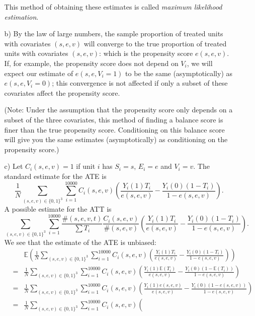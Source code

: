 \documentclass{article}
\def\E{{\mathbb E}}
\begin{document}
\begin{itemize}
\begin{itemize}
      This method of obtaining these
      estimates is called \textit{maximum likelihood estimation}.
    \item[b)]
      By the law of large numbers, the sample proportion of treated units 
      with covariates $(s,e,v)$ will converge to the true proportion of
      treated units with covariates $(s,e,v)$: which is the propensity score $e(s,e,v)$.  
      If, for example, the propensity score does not depend on $V_i$, we will expect
      our estimate of $e(s,e,V_i=1)$ to be the same (asymptotically) as $e(s,e,V_i= 0)$; 
      this convergence is not affected if only a subset of these covariates affect the
      propensity score.
      
      (Note: Under the assumption that the propensity score only depends on a subset of
      the three covariates, this method of finding a balance
      score is finer than the true propensity score.  
      Conditioning on this balance score will give you the same estimates (asymptotically)
      as conditioning on the propensity score.)
    \item[c)]
      Let $C_i(s,e,v) = 1$ if unit $i$ has $S_i = s$, $E_i = e$ and $V_i = v$.
      The standard estimate for the ATE is
      $$
        \frac 1 N\sum_{(s,e,v) \in \{0,1\}^3}\sum_{i = 1}^{10000} C_{i}(s,e,v)\left(
          \frac{Y_i(1)T_i}{e(s,e,v)} - \frac{Y_i(0)(1-T_i)}{1- e(s,e,v)}
        \right).
      $$
      A possible estimate for the ATT is
      $$
       \sum_{(s,e,v) \in \{0,1\}^3}\sum_{i = 1}^{10000} \frac{\#(s,e,v,t)}{\sum T_i}\frac{C_{i}(s,e,v)}{\#(s,e,v)}\left(
          \frac{Y_i(1)T_i}{e(s,e,v)} - \frac{Y_i(0)(1-T_i)}{1- e(s,e,v)}
        \right).
      $$
      We see that the estimate of the ATE is unbiased:
      \begin{eqnarray*}
       && \E\left(\frac 1 N\sum_{(s,e,v) \in \{0,1\}^3}\sum_{i = 1}^{10000} C_{i}(s,e,v)\left(
          \frac{Y_i(1)T_i}{e(s,e,v)} - \frac{Y_i(0)(1-T_i)}{1- e(s,e,v)}
        \right)\right)\\
       &=&\frac 1 N\sum_{(s,e,v) \in \{0,1\}^3}\sum_{i = 1}^{10000} C_{i}(s,e,v)\left(
          \frac{Y_i(1)\E(T_i)}{e(s,e,v)} - \frac{Y_i(0)(1-\E(T_i))}{1- e(s,e,v)}
        \right)\\
      &=&\frac 1 N\sum_{(s,e,v) \in \{0,1\}^3}\sum_{i = 1}^{10000} C_{i}(s,e,v)\left(
          \frac{Y_i(1)e(s,e,v)}{e(s,e,v)} - \frac{Y_i(0)(1-e(s,e,v))}{1- e(s,e,v)}
        \right)\\
      &=&\frac 1 N\sum_{(s,e,v) \in \{0,1\}^3}\sum_{i = 1}^{10000} C_{i}(s,e,v)\left(

\end{eqnarray*}
\end{itemize}
\end{itemize}
\end{document}
